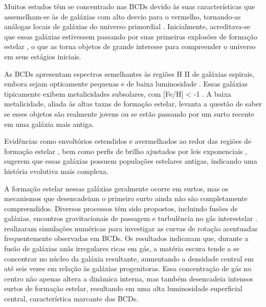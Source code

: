 Muitos estudos têm se concentrado nas BCDs devido às suas características que assemelham-se às de galáxias com alto desvio para o vermelho, tornando-as análogas locais de galáxias do universo primordial \citep{Papaderos_2006}. Inicialmente, acreditava-se que essas galáxias estivessem passando por suas primeiras explosões de formação estelar \citep{Searle_1973, Aloisi_1999, Thuan_1999}, o que as torna objetos de grande interesse para compreender o universo em seus estágios iniciais. 

As BCDs apresentam espectros semelhantes às regiões H II de galáxias espirais, embora sejam opticamente pequenas e de baixa luminosidade \citep{Thuan_Martin_1981}. Essas galáxias tipicamente exibem metalicidades subsolares, com [Fe/H] < -1 \citep{Drozdovsky_Tikhonov_2000, Drozdovsky_2001}. A baixa metalicidade, aliada às altas taxas de formação estelar, levanta a questão de saber se esses objetos são realmente jovens ou se estão passando por um surto recente em uma galáxia mais antiga. 

Evidências como envoltórios estendidos e avermelhados ao redor das regiões de formação estelar \citep{Loose_1985, Kunth_1985}, bem como perfis de brilho ajustados por leis exponenciais \citep{James_1994, Telles_1995, Papaderos_1996, Cairos_1998}, sugerem que essas galáxias possuem populações estelares antigas, indicando uma história evolutiva mais complexa. 

A formação estelar nessas galáxias geralmente ocorre em surtos, mas os mecanismos que desencadeiam o primeiro surto ainda não são completamente compreendidos. Diversos processos têm sido propostos, incluindo fusões de galáxias, encontros gravitacionais de passagem e turbulência no gás interestelar \citep{Noeske_2001, Pustilnik_2001, Bekki_2008}. \cite{Watts_2016} realizaram simulações numéricas para investigar as curvas de rotação acentuadas frequentemente observadas em BCDs. Os resultados indicaram que, durante a fusão de galáxias anãs irregulares ricas em gás, a matéria escura tende a se concentrar no núcleo da galáxia resultante, aumentando a densidade central em até seis vezes em relação às galáxias progenitoras. Essa concentração de gás no centro não apenas altera a dinâmica interna, mas também desencadeia intensos surtos de formação estelar, resultando em uma alta luminosidade superficial central, característica marcante das BCDs.

